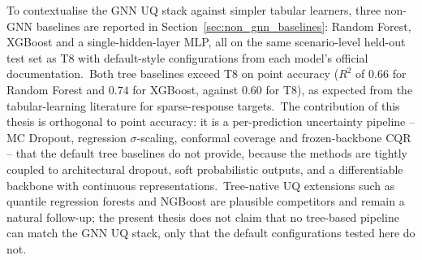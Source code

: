 To contextualise the GNN UQ stack against simpler tabular learners, three non-GNN baselines are reported in Section~\ref{sec:non_gnn_baselines}: Random Forest, XGBoost and a single-hidden-layer MLP, all on the same scenario-level held-out test set as T8 with default-style configurations from each model's official documentation.\ Both tree baselines exceed T8 on point accuracy ($R^2$ of $0.66$ for Random Forest and $0.74$ for XGBoost, against $0.60$ for T8), as expected from the tabular-learning literature for sparse-response targets.\ The contribution of this thesis is orthogonal to point accuracy: it is a per-prediction uncertainty pipeline -- MC Dropout, regression $\sigma$-scaling, conformal coverage and frozen-backbone CQR -- that the default tree baselines do not provide, because the methods are tightly coupled to architectural dropout, soft probabilistic outputs, and a differentiable backbone with continuous representations.\ Tree-native UQ extensions such as quantile regression forests and NGBoost are plausible competitors and remain a natural follow-up; the present thesis does not claim that no tree-based pipeline can match the GNN UQ stack, only that the default configurations tested here do not.
